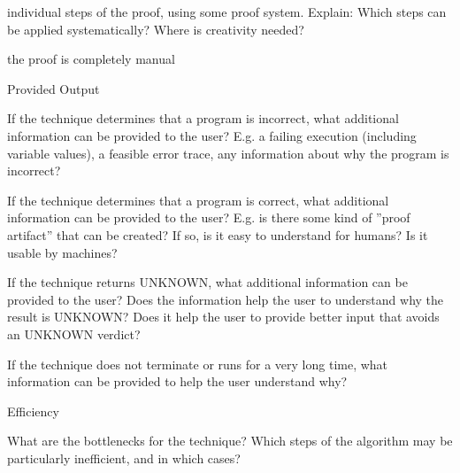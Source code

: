 \documentclass[a4paper]{article}
\begin{document}
\begin{minipage}[t]{0.16\linewidth}
\begin{betterlist}
\begin{betterlist}
			\item \checkboxUnchecked individual steps of the proof, using some proof system. Explain: Which steps can be applied systematically? Where is creativity needed?

			\item \checkboxUnchecked the proof is completely manual
		\end{betterlist}
		\item \alert{Provided Output}
		\begin{betterlist}
			\item If the technique determines that a program is incorrect, what additional information can be provided to the user? E.g. a failing execution (including variable values), a feasible error trace, any information about why the program is incorrect?

			\item If the technique determines that a program is correct, what additional information can be provided to the user? E.g. is there some kind of ”proof artifact” that can be created? If so, is it easy to understand for humans? Is it usable by machines?

			\item If the technique returns UNKNOWN, what additional information can be provided to the user? Does the information help the user to understand why the result is UNKNOWN? Does it help the user to provide better input that avoids an UNKNOWN verdict?

			\item If the technique does not terminate or runs for a very long time, what information can be provided to help the user understand why?

		\end{betterlist}
		\item \alert{Efficiency}
		\begin{betterlist}
			\item What are the bottlenecks for the technique? Which steps of the algorithm may be particularly inefficient, and in which cases?


\end{betterlist}
\end{betterlist}
\end{minipage}
\end{document}
